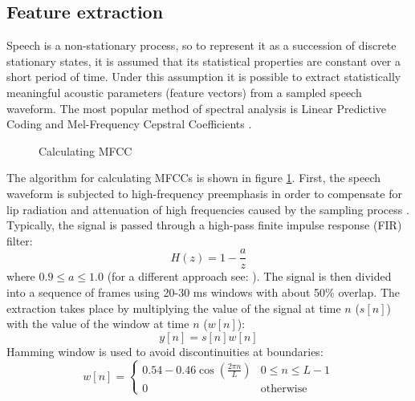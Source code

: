\subsection{Feature extraction}
\label{subsection:features}
Speech is a non-stationary process, so to represent it as a succession of discrete stationary states, it is assumed that its statistical properties are constant over a short period of time. Under this assumption it is possible to extract statistically meaningful acoustic parameters (feature vectors) from a sampled speech waveform. The most popular method of spectral analysis is Linear Predictive Coding  and Mel-Frequency Cepstral Coefficients . 
\begin{figure}[!ht]
  \label{figure:mfcc}
  \centering
  \caption{Calculating MFCC}
\end{figure}

The algorithm for calculating MFCCs is shown in figure \ref{figure:mfcc}. First, the speech waveform is subjected to high-frequency preemphasis in order to compensate for lip radiation and attenuation of high frequencies caused by the sampling process \cite{singh2012preprocessing}. Typically, the signal is passed through a high-pass finite impulse response (FIR)  filter:
\begin{equation}
H(z)=1-\frac{a}{z}
\end{equation}
where $0.9 \leq a \leq 1.0$ (for a different approach see: \cite{nossair1995signal}). The signal is then divided into a sequence of frames using 20-30 ms windows with about 50\% overlap. The extraction takes place by multiplying the value of the signal at time $n$ ($s[n]$) with the value of the window at time $n$ ($w[n]$):
\begin{equation}
  y[n]=s[n]w[n]
\end{equation}
Hamming window is used to avoid discontinuities at boundaries:
\begin{equation}
\label{equation:hamming}
  w[n]=
  \begin{cases}
    0.54-0.46\cos(\frac{2 \pi n}{L}) & 0 \leq n \leq L-1 \\
    0                               & \text{otherwise}
  \end{cases}
\end{equation}

